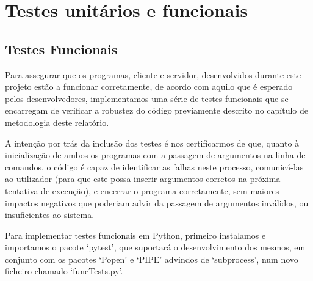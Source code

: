 \documentclass{report}
\begin{document}
\section{Testes unitários e funcionais}
\subsection{Testes Funcionais}

Para assegurar que os programas, cliente e servidor, desenvolvidos durante este projeto estão a funcionar corretamente, de acordo com aquilo que é esperado pelos desenvolvedores, implementamos uma série de testes funcionais que se encarregam de verificar a robustez do
código previamente descrito no capítulo de metodologia deste relatório.

A intenção por trás da inclusão dos testes é nos certificarmos de que, quanto à inicialização de ambos os programas com a passagem de argumentos na linha de comandos, o código é capaz de identificar as falhas neste processo, comunicá-las ao utilizador (para que este
possa inserir argumentos corretos na próxima tentativa de execução), e encerrar o programa corretamente, sem maiores impactos negativos que poderiam advir da passagem de argumentos inválidos, ou insuficientes ao sistema.

Para implementar testes funcionais em Python, primeiro instalamos e importamos o pacote ‘pytest’, que suportará o desenvolvimento dos mesmos, em conjunto com os pacotes ‘Popen’ e ‘PIPE’ advindos de ‘subprocess’, num novo ficheiro chamado ‘funcTests.py’.
\end{document}
